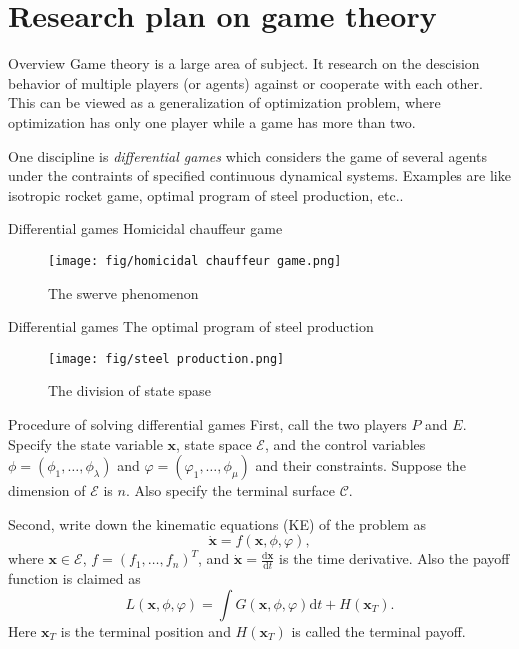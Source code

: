 \documentclass[10pt]{beamer}
\newcommand{\E}{\mathcal{E}}
\newcommand{\C}{\mathcal{C}}
\newcommand{\x}{\mathbf{x}}
\newcommand{\dd}{\mathrm{d}}
\begin{document}
\section{Research plan on game theory}  
\begin{frame}{Overview}
	Game theory is a large area of subject. It research on the descision behavior of multiple players (or agents) against or cooperate with each other. This can be viewed as a generalization of optimization problem, where optimization has only one player while a game has more than two. \par 
  
  One discipline is \emph{differential games} which considers the game of several agents under the contraints of specified continuous dynamical systems. Examples are like isotropic rocket game, optimal program of steel production, etc..
\end{frame}

\begin{frame}{Differential games}
  Homicidal chauffeur game 
  \begin{figure}[htpb!]
    \centering
    \texttt{[image: fig/homicidal chauffeur game.png]}
    \caption{The swerve phenomenon}
    \end{figure}
\end{frame}
\begin{frame}{Differential games}
  The optimal program of steel production 
  \begin{figure}[htpb!]
    \centering
    \texttt{[image: fig/steel production.png]}
    \caption{The division of state spase}
    \end{figure}
\end{frame}

\begin{frame}{Procedure of solving differential games}
  First, call the two players $P$ and $E$. Specify the state variable $\x$, state space $\E$, and the control variables $\phi = (\phi_1,\ldots,\phi_\lambda)$ and $\varphi = (\varphi_1,\ldots,\phi_\mu)$ and their constraints. Suppose the dimension of $\E$ is $n$. Also specify the terminal surface $\C$. \par 

  Second, write down the kinematic equations (KE) of the problem as 
  \begin{equation}
    \dot{\x} = f(\x, \phi, \varphi),
  \end{equation}
  where $\x\in \E$, $f = (f_1,\ldots,f_n)^T$, and $\dot{\x} = \frac{\dd \x}{\dd t}$ is the time derivative. Also the payoff function is claimed as 
  \begin{equation}
    L(\x, \phi, \varphi) = \int G(\x, \phi, \varphi) \dd t + H(\x_T).
  \end{equation}
  Here $\x_T$ is the terminal position and $H(\x_T)$ is called the terminal payoff.
\end{frame}
\end{document}
